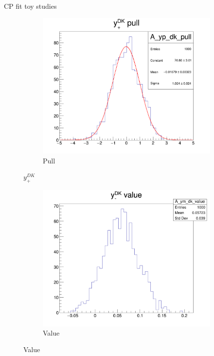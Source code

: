\documentclass{beamer}
\begin{document}
\begin{frame}{CP fit toy studies}
\begin{figure}
    \begin{subfigure}{0.25\textwidth}
      \includegraphics[width = 1.0\textwidth]{Plots/A_yp_dk_pull.png}
      \caption{Pull}
    \end{subfigure}
    \caption{$y_+^{DK}$}
  \end{figure}
  \begin{figure}
    \centering
    \vspace{-0.15cm}
    \begin{subfigure}{0.25\textwidth}
      \includegraphics[width = 1.0\textwidth]{Plots/A_ym_dk_value.png}
      \caption{Value}

\end{subfigure}
\end{figure}
\end{frame}
\end{document}
